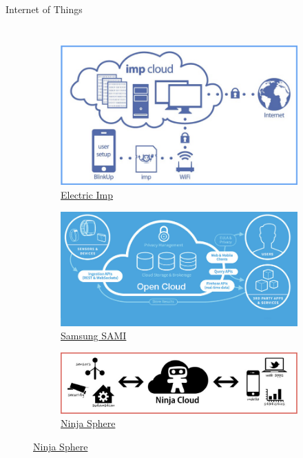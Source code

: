 \begin{frame}{Internet of Things}
\begin{columns}
    \begin{figure}
      \centering
      \begin{subfigure}{0.7\textwidth}
        \includegraphics[width=\textwidth]{figures/cloud1.png}
        \caption{\href{http://www.limetrace.co.uk/electric-imp-platform}{Electric
            Imp}}
      \end{subfigure}
      \begin{subfigure}{0.7\textwidth}
        \includegraphics[width=\textwidth]{figures/cloud2.png}
        \caption{\href{https://developer.samsungsami.io/sami/sami-documentation/}{Samsung
            SAMI}}
      \end{subfigure}
      \begin{subfigure}{0.7\textwidth}
        \includegraphics[width=\textwidth]{figures/cloud3.png}
        \caption{\href{http://lucept.files.wordpress.com/2012/06/ninja-blocks-capture.jpg}{Ninja Sphere}}
      \end{subfigure}
    \end{figure}
  \end{columns}
\end{frame}

